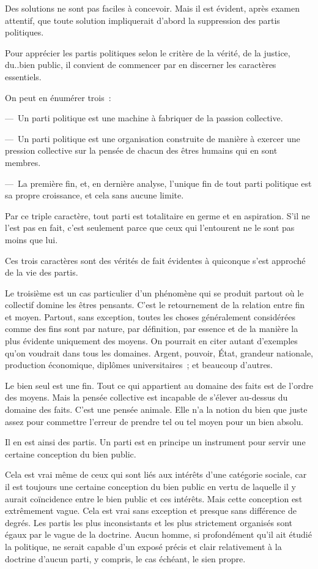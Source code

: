 \documentclass[french,twoside]{book} %
\begin{document}
Des solutions ne sont pas faciles à concevoir. Mais il est évident, après examen attentif, que toute solution impliquerait d’abord la suppression des partis politiques.\par
Pour apprécier les partis politiques selon le critère de la vérité, de la justice, du..bien public, il convient de commencer par en discerner les caractères essentiels.\par
On peut en énumérer trois :\par
— Un parti politique est une machine à fabriquer de la passion collective.\par
— Un parti politique est une organisation construite de manière à exercer une pression collective sur la pensée de chacun des êtres humains qui en sont membres.\par
— La première fin, et, en dernière analyse, l’unique fin de tout parti politique est sa propre croissance, et cela sans aucune limite.\par
Par ce triple caractère, tout parti est totalitaire en germe et en aspiration. S’il ne l’est pas en fait, c’est seulement parce que ceux qui l’entourent ne le sont pas moins que lui.\par
Ces trois caractères sont des vérités de fait évidentes à quiconque s’est approché de la vie des partis.\par
Le troisième est un cas particulier d’un phénomène qui se produit partout où le collectif domine les êtres pensants. C’est le retournement de la relation entre fin et moyen. Partout, sans exception, toutes les choses généralement considérées comme des fins sont par nature, par définition, par essence et de la manière la plus évidente uniquement des moyens. On pourrait en citer autant d’exemples qu’on voudrait dans tous les domaines. Argent, pouvoir, État, grandeur nationale, production économique, diplômes universitaires ; et beaucoup d’autres.\par
Le bien seul est une fin. Tout ce qui appartient au domaine des faits est de l’ordre des moyens. Mais la pensée collective est incapable de s’élever au-dessus du domaine des faits. C’est une pensée animale. Elle n’a la notion du bien que juste assez pour commettre l’erreur de prendre tel ou tel moyen pour un bien absolu.\par
Il en est ainsi des partis. Un parti est en principe un instrument pour servir une certaine conception du bien public.\par
Cela est vrai même de ceux qui sont liés aux intérêts d’une catégorie sociale, car il est toujours une certaine conception du bien public en vertu de laquelle il y aurait coïncidence entre le bien public et ces intérêts. Mais cette conception est extrêmement vague. Cela est vrai sans exception et presque sans différence de degrés. Les partis les plus inconsistants et les plus strictement organisés sont égaux par le vague de la doctrine. Aucun homme, si profondément qu’il ait étudié la politique, ne serait capable d’un exposé précis et clair relativement à la doctrine d’aucun parti, y compris, le cas échéant, le sien propre.\par
\end{document}

